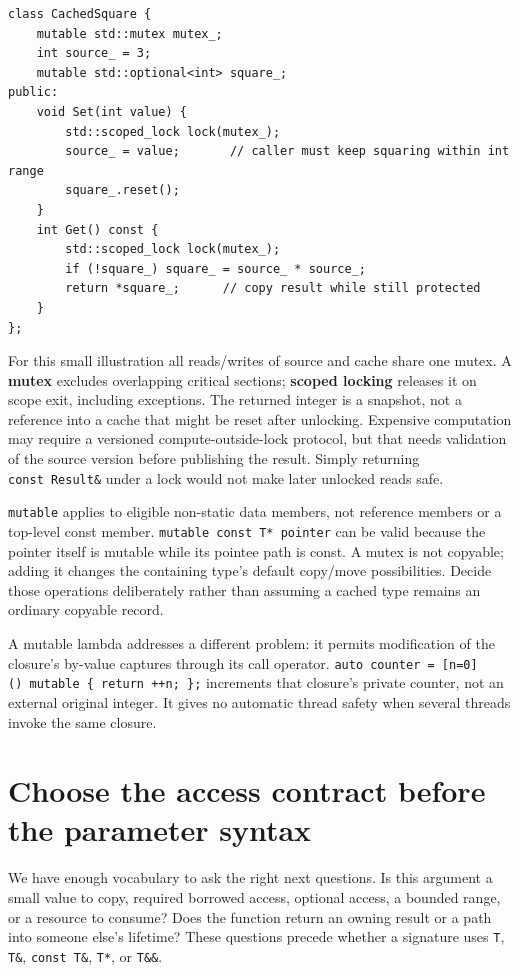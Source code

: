\begin{verbatim}
class CachedSquare {
    mutable std::mutex mutex_;
    int source_ = 3;
    mutable std::optional<int> square_;
public:
    void Set(int value) {
        std::scoped_lock lock(mutex_);
        source_ = value;       // caller must keep squaring within int range
        square_.reset();
    }
    int Get() const {
        std::scoped_lock lock(mutex_);
        if (!square_) square_ = source_ * source_;
        return *square_;      // copy result while still protected
    }
};
\end{verbatim}

For this small illustration all reads/writes of source and cache share one mutex. A \textbf{mutex} excludes overlapping critical sections; \textbf{scoped locking} releases it on scope exit, including exceptions. The returned integer is a snapshot, not a reference into a cache that might be reset after unlocking. Expensive computation may require a versioned compute-outside-lock protocol, but that needs validation of the source version before publishing the result. Simply returning \texttt{const\ Result\&} under a lock would not make later unlocked reads safe.

\texttt{mutable} applies to eligible non-static data members, not reference members or a top-level const member. \texttt{mutable\ const\ T*\ pointer} can be valid because the pointer itself is mutable while its pointee path is const. A mutex is not copyable; adding it changes the containing type's default copy/move possibilities. Decide those operations deliberately rather than assuming a cached type remains an ordinary copyable record.

A mutable lambda addresses a different problem: it permits modification of the closure's by-value captures through its call operator. \texttt{auto\ counter\ =\ {[}n=0{]}()\ mutable\ \{\ return\ ++n;\ \};} increments that closure's private counter, not an external original integer. It gives no automatic thread safety when several threads invoke the same closure.

\section{Choose the access contract before the parameter syntax}\label{01-foundations-i-ch003-choose-the-access-contract-before-the-parameter-syntax}

We have enough vocabulary to ask the right next questions. Is this argument a small value to copy, required borrowed access, optional access, a bounded range, or a resource to consume? Does the function return an owning result or a path into someone else's lifetime? These questions precede whether a signature uses \texttt{T}, \texttt{T\&}, \texttt{const\ T\&}, \texttt{T*}, or \texttt{T\&\&}.

